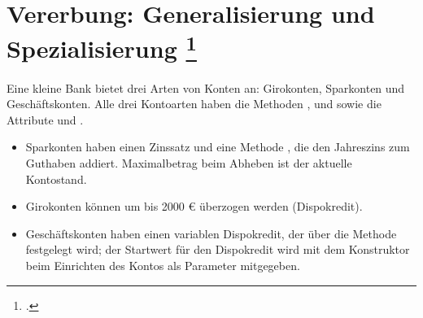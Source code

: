 \documentclass{bschlangaul-aufgabe}
\begin{document}

\section{Vererbung: Generalisierung und Spezialisierung
\footcite[Seite 60, Oldenburg, Informatik II, S. 128]{oomup:fs:3}}

Eine kleine Bank bietet drei Arten von Konten an: Girokonten, Sparkonten
und Geschäftskonten. Alle drei Kontoarten haben die Methoden
,  und  sowie die
Attribute  und .

\begin{itemize}
\item Sparkonten haben einen Zinssatz und eine Methode ,
die den Jahreszins zum Guthaben addiert. Maximalbetrag beim Abheben ist
der aktuelle Kontostand.

\item Girokonten können um bis 2000 € überzogen werden (Dispokredit).

\item Geschäftskonten haben einen variablen Dispokredit, der über die
Methode  festgelegt wird; der Startwert für den
Dispokredit wird mit dem Konstruktor beim Einrichten des Kontos als
Parameter mitgegeben.
\end{itemize}
\end{document}
